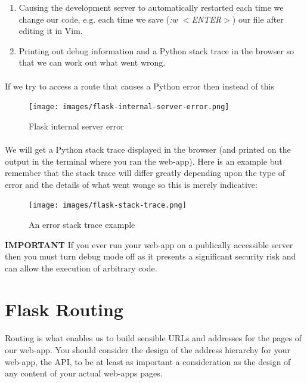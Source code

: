 \documentclass[12pt, a4paper, oneside]{book}
\begin{document}
\begin{enumerate}
\item Causing the development server to automatically restarted each time we change our code, e.g. each time we save (\emph{:w $<$ENTER$>$}) our file after editing it in Vim.
\item Printing out debug information and a Python stack trace in the browser so that we can work out what went wrong.
\end{enumerate}

\paragraph{} If we try to access a route that causes a Python error then instead of this

\begin{figure}[H]
\centering
\texttt{[image: images/flask-internal-server-error.png]}
\caption{Flask internal server error}
\label{fig:flask-internal-server-error}
\end{figure}
 \paragraph{} We will get a Python stack trace displayed in the browser (and printed on the output in the terminal where you ran the web-app). Here is an example but remember that the stack trace will differ greatly depending upon the type of error and the details of what went wonge so this is merely indicative:

\begin{figure}[H]
\centering
\texttt{[image: images/flask-stack-trace.png]}
\caption{An error stack trace example}
\label{fig:flask-stack-trace}
\end{figure}


\begin{framed}
\textbf{IMPORTANT} If you ever run your web-app on a publically accessible server then you must turn debug mode off as it presents a significant security risk and can allow the execution of arbitrary code.
\end{framed}

\section{Flask Routing}
\label{routing}
\paragraph{} Routing is what enables us to build sensible URLs and addresses for the pages of our web-app. You should consider the design of the address hierarchy for your web-app, the API, to be at least as important a consideration as the design of any content of your actual web-apps pages.
\end{document}

